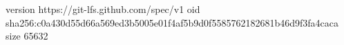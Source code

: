 version https://git-lfs.github.com/spec/v1
oid sha256:c0a430d55d66a569ed3b5005e01f4af5b9d0f5585762182681b46d9f3fa4caca
size 65632

